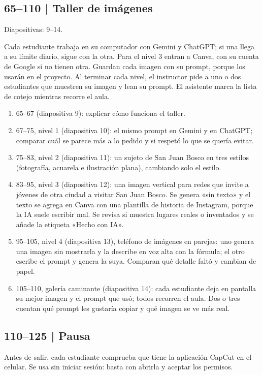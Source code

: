 \documentclass[11pt,a4paper]{article}
\newcommand{\diapos}[1]{\textcolor{gris}{\small\textsf{Diapositivas: #1}}\par}
\begin{document}
\subsection{65--110 | Taller de imágenes}
\diapos{9--14.}
Cada estudiante trabaja en su computador con Gemini y ChatGPT; si una llega a su límite diario, sigue con la otra. Para el nivel 3 entran a Canva, con su cuenta de Google si no tienen otra. Guardan cada imagen con su prompt, porque los usarán en el proyecto. Al terminar cada nivel, el instructor pide a uno o dos estudiantes que muestren su imagen y lean su prompt. El asistente marca la lista de cotejo mientras recorre el aula.
\begin{enumerate}
\item 65--67 (diapositiva 9): explicar cómo funciona el taller.
\item 67--75, nivel 1 (diapositiva 10): el mismo prompt en Gemini y en ChatGPT; comparar cuál se parece más a lo pedido y si respetó lo que se quería evitar.
\item 75--83, nivel 2 (diapositiva 11): un sujeto de San Juan Bosco en tres estilos (fotografía, acuarela e ilustración plana), cambiando solo el estilo.
\item 83--95, nivel 3 (diapositiva 12): una imagen vertical para redes que invite a jóvenes de otra ciudad a visitar San Juan Bosco. Se genera «sin texto» y el texto se agrega en Canva con una plantilla de historia de Instagram, porque la IA suele escribir mal. Se revisa si muestra lugares reales o inventados y se añade la etiqueta «Hecho con IA».
\item 95--105, nivel 4 (diapositiva 13), teléfono de imágenes en parejas: uno genera una imagen sin mostrarla y la describe en voz alta con la fórmula; el otro escribe el prompt y genera la suya. Comparan qué detalle faltó y cambian de papel.
\item 105--110, galería caminante (diapositiva 14): cada estudiante deja en pantalla su mejor imagen y el prompt que usó; todos recorren el aula. Dos o tres cuentan qué prompt les gustaría copiar y qué imagen se ve más real.
\end{enumerate}

\subsection{110--125 | Pausa}
Antes de salir, cada estudiante comprueba que tiene la aplicación CapCut en el celular. Se usa sin iniciar sesión: basta con abrirla y aceptar los permisos.
\end{document}
